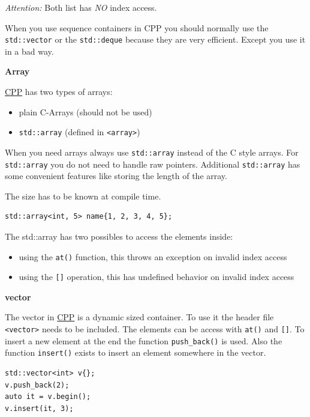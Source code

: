 \documentclass[11pt,twoside,landscape]{article}
\begin{document}
\begin{multicols}{3}
\emph{Attention:} Both list has \emph{NO} index access.

When you use sequence containers in CPP you should normally use the \texttt{std::vector} or the \texttt{std::deque} because they are very efficient.
Except you use it in a bad way.

\textbf{Array}

\href{../../../roam/20210920103243-c.org}{CPP} has two types of arrays:
\begin{itemize}
\item plain C-Arrays (should not be used)
\item \texttt{std::array} (defined in \texttt{<array>})
\end{itemize}

When you need arrays always use \texttt{std::array} instead of the C style arrays.
For \texttt{std::array} you do not need to handle raw pointers.
Additional \texttt{std::array} has some convenient features like storing the length of the array.


The size has to be known at compile time.
\lstset{language=c++,label= ,caption= ,captionpos=b,numbers=none}
\begin{lstlisting}
std::array<int, 5> name{1, 2, 3, 4, 5};
\end{lstlisting}



The std::array has two possibles to access the elements inside:
\begin{itemize}
\item using the \texttt{at()} function, this throws an exception on invalid index access
\item using the \texttt{[]} operation, this has undefined behavior on invalid index access
\end{itemize}


\textbf{vector}

The vector in \href{../../../roam/20210920103243-c.org}{CPP} is a dynamic sized container.
To use it the header file \texttt{<vector>} needs to be included.
The elements can be access with \texttt{at()} and \texttt{[]}.
To insert a new element at the end the function \texttt{push\_back()} is used.
Also the function \texttt{insert()} exists to insert an element somewhere in the vector.

\lstset{language=c++,label= ,caption= ,captionpos=b,numbers=none}
\begin{lstlisting}
std::vector<int> v{};
v.push_back(2);
auto it = v.begin();
v.insert(it, 3);
\end{lstlisting}


\end{multicols}
\end{document}
